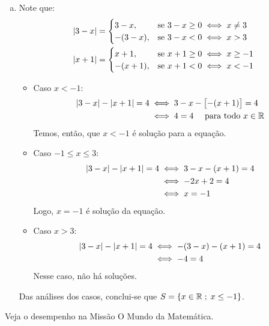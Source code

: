 \begin{solution}
\begin{enumerate}[(a)]
	\item Note que:
	\begin{align*}
		& \left|3-x\right|= 
		\begin{cases}
			3-x,    & \text{se } 3-x \ge 0 \iff x \ne 3 \\
			-(3-x), & \text{se } 3-x < 0 \iff x > 3
		\end{cases}\\
		& \left|x+1\right|= 
		\begin{cases}
			x+1,    & \text{se } x+1 \ge 0 \iff x \ge -1 \\
			-(x+1), & \text{se } x+1 < 0 \iff x < -1
		\end{cases}
	\end{align*}
	\begin{itemize}
		\item Caso $x<-1$: 
		\begin{align*}
			\left|3-x\right|-\left|x+1\right|=4 &\iff 3-x-\left[-(x+1)\right]=4\\
									&\iff 4=4 \ \ \ \text{ para todo } x \in \mathbb{R}
		\end{align*}
		Temos, então, que $x<-1$ é solução para a equação.
		\item Caso $-1 \le x \le 3$:
		\begin{align*}
			\left|3-x\right|-\left|x+1\right|=4 &\iff 3-x-(x+1)=4\\
									&\iff -2x+2=4\\
									&\iff x=-1
		\end{align*}
		Logo, $x=-1$ é solução da equação.
		\item Caso $x>3$:
		\begin{align*}
			\left|3-x\right|-\left|x+1\right|=4 &\iff -(3-x)-(x+1)=4\\
									&\iff -4=4
		\end{align*}
		Nesse caso, não há soluções.
	\end{itemize}

	Das análises dos casos, conclui-se que $S=\left\{x \in \mathbb{R} \;;\; x \le -1\right\}$.
\end{enumerate}
\end{solution}

\begin{onlineact}
Veja o desempenho na Missão O Mundo da Matemática.
\end{onlineact}

